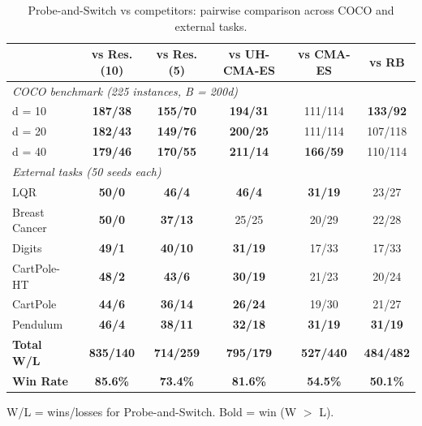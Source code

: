 \begin{table}[t]
\centering
\caption{Probe-and-Switch vs competitors: pairwise comparison across COCO and external tasks.}
\label{tab:probeswitch_comparison}
\small
\begin{tabular}{l c c c c c}
\toprule
                    & vs Res.(10) & vs Res.(5) & vs UH-CMA-ES & vs CMA-ES & vs RB \\
\midrule
\multicolumn{6}{l}{\textit{COCO benchmark (225 instances, B = 200d)}} \\
\quad d = 10        & \textbf{187/38} & \textbf{155/70} & \textbf{194/31} & 111/114 & \textbf{133/92} \\
\quad d = 20        & \textbf{182/43} & \textbf{149/76} & \textbf{200/25} & 111/114 & 107/118 \\
\quad d = 40        & \textbf{179/46} & \textbf{170/55} & \textbf{211/14} & \textbf{166/59} & 110/114 \\
\midrule
\multicolumn{6}{l}{\textit{External tasks (50 seeds each)}} \\
\quad LQR           & \textbf{50/0} & \textbf{46/4} & \textbf{46/4} & \textbf{31/19} & 23/27 \\
\quad Breast Cancer & \textbf{50/0} & \textbf{37/13} & 25/25 & 20/29 & 22/28 \\
\quad Digits        & \textbf{49/1} & \textbf{40/10} & \textbf{31/19} & 17/33 & 17/33 \\
\quad CartPole-HT   & \textbf{48/2} & \textbf{43/6} & \textbf{30/19} & 21/23 & 20/24 \\
\quad CartPole      & \textbf{44/6} & \textbf{36/14} & \textbf{26/24} & 19/30 & 21/27 \\
\quad Pendulum      & \textbf{46/4} & \textbf{38/11} & \textbf{32/18} & \textbf{31/19} & \textbf{31/19} \\
\midrule
\textbf{Total W/L}  & \textbf{835/140} & \textbf{714/259} & \textbf{795/179} & \textbf{527/440} & \textbf{484/482} \\
\textbf{Win Rate}   & \textbf{85.6\%} & \textbf{73.4\%} & \textbf{81.6\%} & \textbf{54.5\%} & \textbf{50.1\%} \\
\bottomrule
\end{tabular}
\vspace{1mm}
\begin{minipage}{\linewidth}
\footnotesize
W/L = wins/losses for Probe-and-Switch. Bold = win (W $>$ L).
\end{minipage}
\end{table}